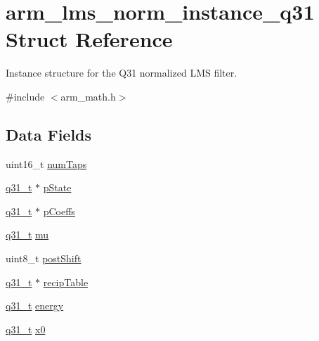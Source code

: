 \hypertarget{structarm__lms__norm__instance__q31}{}\section{arm\+\_\+lms\+\_\+norm\+\_\+instance\+\_\+q31 Struct Reference}
\label{structarm__lms__norm__instance__q31}


Instance structure for the Q31 normalized L\+MS filter.  




{\ttfamily \#include $<$arm\+\_\+math.\+h$>$}

\subsection*{Data Fields}
\begin{DoxyCompactItemize}
\item 
uint16\+\_\+t \mbox{\hyperlink{structarm__lms__norm__instance__q31_a751941891e47f522a7f5375fe8990aac}{num\+Taps}}
\item 
\mbox{\hyperlink{arm__math_8h_adc89a3547f5324b7b3b95adec3806bc0}{q31\+\_\+t}} $\ast$ \mbox{\hyperlink{structarm__lms__norm__instance__q31_adee4ba3ee8869865af7d8fa08ca913d6}{p\+State}}
\item 
\mbox{\hyperlink{arm__math_8h_adc89a3547f5324b7b3b95adec3806bc0}{q31\+\_\+t}} $\ast$ \mbox{\hyperlink{structarm__lms__norm__instance__q31_a68888e36167d81cb7836db10367a1682}{p\+Coeffs}}
\item 
\mbox{\hyperlink{arm__math_8h_adc89a3547f5324b7b3b95adec3806bc0}{q31\+\_\+t}} \mbox{\hyperlink{structarm__lms__norm__instance__q31_a21ab4237a726ea7751f5026d89d2e577}{mu}}
\item 
uint8\+\_\+t \mbox{\hyperlink{structarm__lms__norm__instance__q31_a74050e9f36542bd56f4052381a82ae8f}{post\+Shift}}
\item 
\mbox{\hyperlink{arm__math_8h_adc89a3547f5324b7b3b95adec3806bc0}{q31\+\_\+t}} $\ast$ \mbox{\hyperlink{structarm__lms__norm__instance__q31_aec8a88dd688519b6b1e3c8d2e24bb775}{recip\+Table}}
\item 
\mbox{\hyperlink{arm__math_8h_adc89a3547f5324b7b3b95adec3806bc0}{q31\+\_\+t}} \mbox{\hyperlink{structarm__lms__norm__instance__q31_a012fee0f71095d2557bb633e73ef7355}{energy}}
\item 
\mbox{\hyperlink{arm__math_8h_adc89a3547f5324b7b3b95adec3806bc0}{q31\+\_\+t}} \mbox{\hyperlink{structarm__lms__norm__instance__q31_a973b8350a0c7b113a5f002bc0b86bf76}{x0}}
\end{DoxyCompactItemize}


